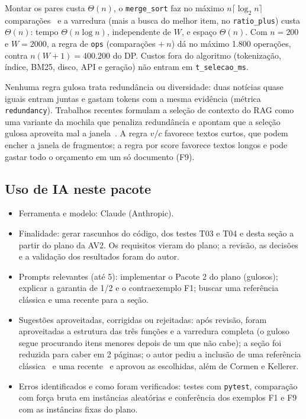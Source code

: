 Montar os pares custa $\Theta(n)$, o \texttt{merge\_sort} faz no máximo
$n\lceil\log_2 n\rceil$ comparações~\cite{cormen2012} e a varredura (mais a busca do melhor item,
no \texttt{ratio\_plus}) custa $\Theta(n)$: tempo $\Theta(n \log n)$,
independente de $W$, e espaço $\Theta(n)$. Com $n = 200$ e $W = 2000$, a regra
de \texttt{ops} (comparações $+\ n$) dá no máximo 1.800 operações, contra
$n(W+1) = 400.200$ do DP. Custos fora do algoritmo (tokenização, índice, BM25,
disco, API e geração) não entram em \texttt{t\_selecao\_ms}.

Nenhuma regra gulosa trata redundância ou diversidade: duas notícias quase
iguais entram juntas e gastam tokens com a mesma evidência (métrica
\texttt{redundancy}). Trabalhos recentes formulam a seleção de contexto do RAG
como uma variante da mochila que penaliza redundância e apontam que a seleção
gulosa aproveita mal a janela~\cite{xu2026}. A regra $v/c$ favorece textos curtos, que podem encher a
janela de fragmentos; a regra por score favorece textos longos e pode gastar
todo o orçamento em um só documento (F9).

\subsection*{Uso de IA neste pacote}
\begin{itemize}
  \item Ferramenta e modelo: Claude (Anthropic).
  \item Finalidade: gerar rascunhos do código, dos testes T03 e T04 e desta
    seção a partir do plano da AV2. Os requisitos vieram do plano; a revisão,
    as decisões e a validação dos resultados foram do autor.
  \item Prompts relevantes (até 5): implementar o Pacote 2 do plano (gulosos);
    explicar a garantia de 1/2 e o contraexemplo F1; buscar uma referência
    clássica e uma recente para a seção.
  \item Sugestões aproveitadas, corrigidas ou rejeitadas: após revisão, foram
    aproveitadas a estrutura das três funções e a varredura completa (o guloso
    segue procurando itens menores depois de um que não cabe); a seção foi
    reduzida para caber em 2 páginas; o autor pediu a inclusão de uma
    referência clássica~\cite{dantzig1957} e uma recente~\cite{xu2026} e
    aprovou as escolhidas, além de Cormen e Kellerer.
  \item Erros identificados e como foram verificados: testes com
    \texttt{pytest}, comparação com força bruta em instâncias aleatórias e
    conferência dos exemplos F1 e F9 com as instâncias fixas do plano.
\end{itemize}
